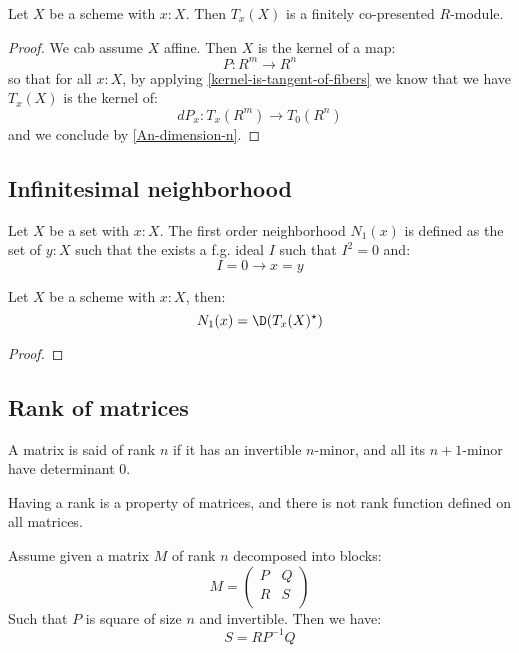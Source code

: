 \begin{lemma}
Let $X$ be a scheme with $x : X$. Then $T_x(X)$ is a finitely
co-presented $R$-module.
\end{lemma}

\begin{proof}
We cab assume $X$ affine. Then $X$ is the kernel of a map:
\[P:R^m\to R^n\]
so that for all $x:X$, by applying \cref{kernel-is-tangent-of-fibers} we know that we have $T_x(X)$ is the kernel of:
\[dP_x : T_x(R^m)\to T_0(R^n)\]
and we conclude by \cref{An-dimension-n}.
\end{proof}


\subsection{Infinitesimal neighborhood}

\begin{definition}
Let $X$ be a set with $x:X$. The first order neighborhood $N_1(x)$ is defined as the set of $y:X$ such that the exists a f.g. ideal $I$ such that $I^{2}=0$ and:
\[I=0 \to x=y\]
\end{definition}

\begin{lemma}\label{duality-infinitesimal-tangent}
Let $X$ be a scheme with $x:X$, then:
\[N_1(x) = \D(T_x(X)^\star)\]
\end{lemma}

\begin{proof}
\end{proof}


\subsection{Rank of matrices}

\begin{definition}
A matrix is said of rank $n$ if it has an invertible $n$-minor, and all its $n+1$-minor have determinant $0$.
\end{definition}

Having a rank is a property of matrices, and there is not rank function defined on all matrices.

\begin{lemma}\label{rank-bloc-matrix}
Assume given a matrix $M$ of rank $n$ decomposed into blocks:
\[M = \begin{pmatrix}
P & Q  \\
R & S \\
\end{pmatrix}\]
Such that $P$ is square of size $n$ and invertible. Then we have:
\[S = RP^{-1}Q\]
\end{lemma}

